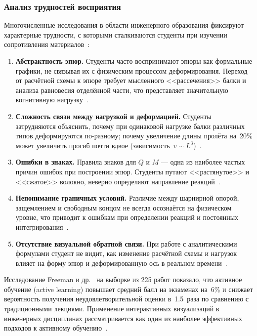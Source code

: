 \subsubsection{Анализ трудностей восприятия}

Многочисленные исследования в области инженерного образования фиксируют характерные трудности, с которыми сталкиваются студенты при изучении сопротивления материалов~\cite{philpot2006, philpot2003}:

\begin{enumerate}
  \item \textbf{Абстрактность эпюр.} Студенты часто воспринимают эпюры как формальные графики, не связывая их с физическим процессом деформирования. Переход от расчётной схемы к эпюре требует мысленного <<рассечения>> балки и анализа равновесия отделённой части, что представляет значительную когнитивную нагрузку~\cite{steif2005}.

  \item \textbf{Сложность связи между нагрузкой и деформацией.} Студенты затрудняются объяснить, почему при одинаковой нагрузке балки различных типов деформируются по-разному; почему увеличение длины пролёта на~20\% может увеличить прогиб почти вдвое (зависимость~$v \sim L^3$)~\cite{feodosev}.

  \item \textbf{Ошибки в знаках.} Правила знаков для $Q$ и $M$ --- одна из наиболее частых причин ошибок при построении эпюр. Студенты путают <<растянутое>> и <<сжатое>> волокно, неверно определяют направление реакций~\cite{belyaev, darkov}.

  \item \textbf{Непонимание граничных условий.} Различие между шарнирной опорой, защемлением и свободным концом не всегда осознаётся на физическом уровне, что приводит к ошибкам при определении реакций и постоянных интегрирования~\cite{aleksandrov}.

  \item \textbf{Отсутствие визуальной обратной связи.} При работе с аналитическими формулами студент не видит, как изменение расчётной схемы и нагрузок влияет на форму эпюр и деформированную ось в реальном времени~\cite{balandina, vasilenko}.
\end{enumerate}

Исследование Freeman и др.~\cite{freeman2014} на выборке из 225 работ показало, что активное обучение (active learning) повышает средний балл на экзаменах на~6\% и снижает вероятность получения неудовлетворительной оценки в~1.5~раза по сравнению с традиционными лекциями. Применение интерактивных визуализаций в инженерных дисциплинах рассматривается как один из наиболее эффективных подходов к активному обучению~\cite{makarenko, solovyev}.

